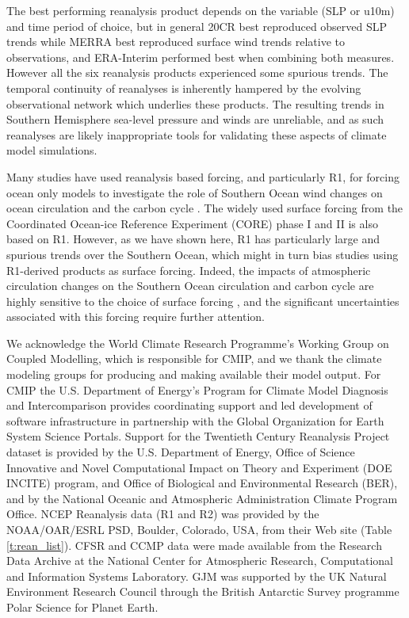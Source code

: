 \documentclass{ametsoc}
\begin{document}
The best performing reanalysis product depends on the variable (SLP or u10m) 
and time period of choice, but in general 20CR best reproduced observed SLP 
trends while MERRA best reproduced surface wind trends relative to observations,
and ERA-Interim performed best when combining both measures. 
However all the six reanalysis products experienced some spurious trends. 
The temporal continuity of reanalyses is inherently 
hampered by the evolving observational network which underlies these products. 
The resulting trends in Southern Hemisphere sea-level pressure and winds are 
unreliable, and as such reanalyses are likely inappropriate tools for 
validating these aspects of climate model simulations.

Many studies have used reanalysis based forcing, and particularly R1, for forcing ocean 
only models to investigate the role of Southern Ocean wind changes on ocean circulation 
\citep[e.g.][]{Screen_et_al_2009} and the carbon cycle 
\citep[e.g.][]{Le_Quere_et_al_2007, Lovenduski_et_al_2008}. The widely
used surface forcing from the Coordinated Ocean-ice Reference Experiment (CORE) phase I and II
\citep{Large_and_Yeager_2009, Griffies_et_al_2009, Danabasoglu_et_al_2014} 
is also based on R1. However, as we
have shown here, R1 has particularly large and spurious trends over the Southern 
Ocean, which might in turn bias studies using R1-derived products as surface forcing. 
Indeed, the impacts of atmospheric circulation changes on the Southern Ocean circulation
and carbon cycle are highly sensitive to the choice of surface forcing 
\citep{Swart_et_al_2014}, and the significant uncertainties associated with this forcing
require further attention.


%
\acknowledgments
We acknowledge the World Climate Research Programme's Working Group on 
Coupled Modelling, which is responsible for CMIP, and we thank the climate 
modeling groups for producing and making available their model output. For 
CMIP the U.S. Department of Energy's Program for Climate Model Diagnosis
and Intercomparison provides coordinating support and led 
development of software infrastructure in partnership with the Global 
Organization for Earth System Science Portals. Support for the Twentieth Century 
Reanalysis Project dataset is provided by the U.S. Department of Energy, Office of 
Science Innovative and Novel Computational Impact on Theory and Experiment (DOE INCITE) 
program, and Office of Biological and Environmental Research (BER), and by the National 
Oceanic and Atmospheric Administration Climate Program Office. NCEP Reanalysis data 
(R1 and R2) was provided by the NOAA/OAR/ESRL PSD, Boulder, Colorado, USA, from their 
Web site (Table \ref{t:rean_list}). CFSR and CCMP data were made available from the Research 
Data Archive at the National Center for Atmospheric Research, Computational and 
Information Systems Laboratory. GJM was supported by the UK Natural Environment Research 
Council through the British Antarctic Survey programme Polar Science for Planet Earth.
\end{document}

